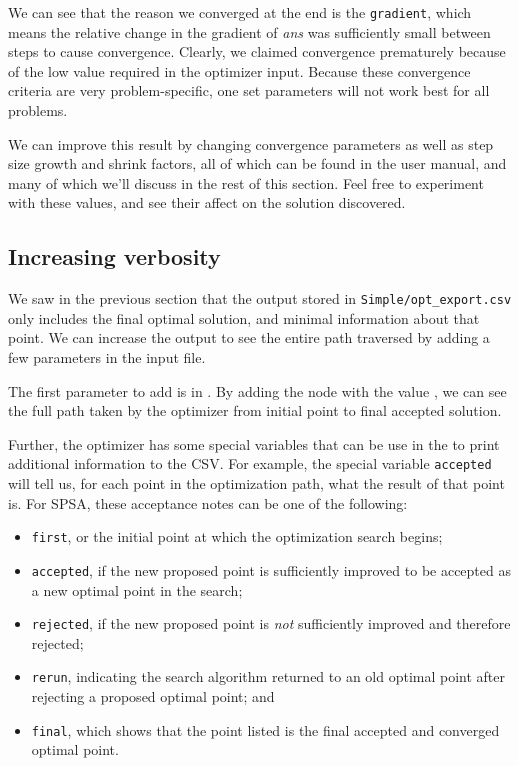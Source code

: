 We can see that the reason we converged at the end is the
\texttt{gradient}, which means the relative change in the gradient of \emph{ans} was sufficiently
small between steps to cause convergence.  Clearly, we claimed convergence prematurely because of
the low value required in the optimizer input.  Because these convergence criteria are very
problem-specific, one set parameters will not work best for all problems.

We can improve this result by changing convergence
parameters as well as step size growth and shrink factors, all of which can be found in the user manual, and
many of which we'll discuss in the rest of this section. Feel free to experiment with these values,
and see their affect on the solution discovered.

\subsection{Increasing verbosity}
We saw in the previous section that the output stored in \texttt{Simple/opt\_export.csv} only
includes the final optimal solution, and minimal information about that point. We can increase the
output to see the entire path traversed by adding a few parameters in the input file.

The first parameter to add is in  
. By adding the node  with the value , we
can see the full path taken by the optimizer from initial point to final accepted solution.

Further, the optimizer has some special variables that can be use in the 
 to print additional information to the CSV. For example, the special variable
\texttt{accepted} will tell us, for each point in the optimization path, what the result of that
point is. For SPSA, these acceptance notes can be one of the following:
\begin{itemize}
  \item \texttt{first}, or the initial point at which the optimization search begins;
  \item \texttt{accepted}, if the new proposed point is sufficiently improved to be accepted as a
    new optimal point in the search;
  \item \texttt{rejected}, if the new proposed point is \emph{not} sufficiently improved and
    therefore rejected;
  \item \texttt{rerun}, indicating the search algorithm returned to an old optimal point after
    rejecting a proposed optimal point; and
  \item \texttt{final}, which shows that the point listed is the final accepted and converged
    optimal point.
\end{itemize}



